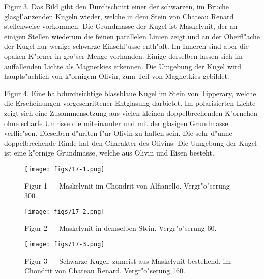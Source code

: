\documentclass[a4paper, 11pt, oneside, polutonikogreek, german]{article}
\begin{document}
Figur 3. Das Bild gibt den Durchschnitt einer der schwarzen, im Bruche glasgl"anzenden Kugeln wieder, welche in dem Stein von Chateau Renard stellenweise vorkommen. Die Grundmasse der Kugel ist Maskelynit, der an einigen Stellen wiederum die feinen parallelen Linien zeigt und an der Oberfl"ache der Kugel nur wenige schwarze Einschl"usse enth"alt. Im Inneren sind aber die opaken K"orner in gro"ser Menge vorhanden. Einige derselben lassen sich im auffallenden Lichte als Magnetkies erkennen. Die Umgebung der Kugel wird haupts"achlich von k"ornigem Olivin, zum Teil von Magnetkies gebildet.

Figur 4. Eine halbdurchsichtige blassblaue Kugel im Stein von Tipperary, welche die Erscheinungen vorgeschrittener Entglasung darbietet. Im polarisierten Lichte zeigt sich eine Zusammensetzung aus vielen kleinen doppelbrechenden K"ornchen ohne scharfe Umrisse die miteinander und mit der glasigen Grundmasse verflie"sen. Dieselben d"urften f"ur Olivin zu halten sein. Die sehr d"unne doppelbrechende Rinde hat den Charakter des Olivins. Die Umgebung der Kugel ist eine k"ornige Grundmasse, welche aus Olivin und Eisen besteht.
\clearpage

\vspace*{\fill}
\begin{figure}[H]
\centering
\texttt{[image: figs/17-1.png]}
\caption{\small Figur 1 --- Maskelynit im Chondrit von Alfianello. Vergr"o"serung 300.}
\end{figure}
\vspace*{\fill}
\clearpage

\vspace*{\fill}
\begin{figure}[H]
\centering
\texttt{[image: figs/17-2.png]}
\caption{\small Figur 2 --- Maskelynit in demselben Stein. Vergr"o"serung 60.}
\end{figure}
\vspace*{\fill}
\clearpage

\vspace*{\fill}
\begin{figure}[H]
\centering
\texttt{[image: figs/17-3.png]}
\caption{\small Figur 3 --- Schwarze Kugel, zumeist aus Maskelynit bestehend, im Chondrit von Chateau Renard. Vergr"o"serung 160.}
\end{figure}
\vspace*{\fill}
\clearpage
\end{document}
